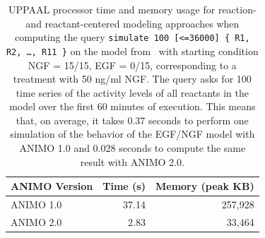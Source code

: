 \documentclass{bmcart}
\begin{document}
\begin{backmatter}
\begin{table}[h!]
\scriptsize
  \begin{center}
  \begin{tabular}{|l||r|r|}
    \hline
    ANIMO Version & Time (s) & Memory (peak KB) \\
    \hline
    \hline
    ANIMO 1.0 & 37.14 & 257,928 \\
    \hline
    ANIMO 2.0 & 2.83 & 33,464 \\
    \hline
  \end{tabular}
  \end{center}
  \caption{UPPAAL processor time and memory usage for reaction- and reactant-centered modeling approaches when computing
  the query {\tt simulate 100 [<=36000] \{ R1, R2, \dots, R11 \}} on the model from~\cite{animo-bibe} with starting condition
  NGF = 15/15, EGF = 0/15, corresponding to a treatment with 50 ng/ml NGF.
  The query asks for 100 time series of the activity levels of all reactants in the model over the first 60 minutes
  of execution. This means that, on average, it takes 0.37 seconds to perform one simulation of the behavior
  of the EGF/NGF model with ANIMO 1.0 and 0.028 seconds to compute the same result with ANIMO 2.0.\label{tab:sim-100}}
\end{table}




\end{backmatter}
\end{document}
